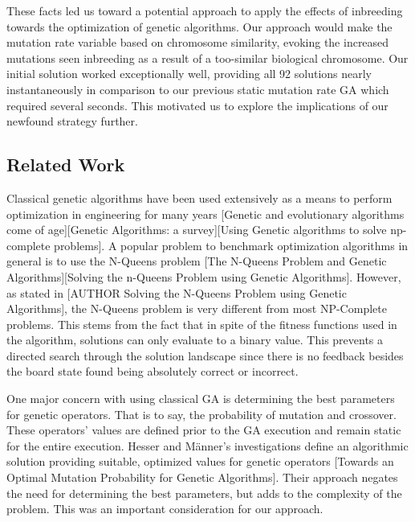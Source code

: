 \documentclass{sig-alternate}
\begin{document}
These facts led us toward a potential approach to apply the effects of inbreeding towards the optimization of genetic algorithms. Our approach would make the mutation rate variable based on chromosome similarity, evoking the increased mutations seen inbreeding as a result of a too-similar biological chromosome. Our initial solution worked exceptionally well, providing all 92 solutions nearly instantaneously in comparison to our previous static mutation rate GA which required several seconds. This motivated us to explore the implications of our newfound strategy further.

\subsection{Related Work}

Classical genetic algorithms have been used extensively as a means to perform optimization in engineering for many years [Genetic and evolutionary algorithms come of age][Genetic Algorithms: a survey][Using Genetic algorithms to solve np-complete problems]. A popular problem to benchmark optimization algorithms in general is to use the N-Queens problem [The N-Queens Problem and Genetic Algorithms][Solving the n-Queens Problem using Genetic Algorithms]. However, as stated in [AUTHOR Solving the N-Queens Problem using Genetic Algorithms], the N-Queens problem is very different from most NP-Complete problems. This stems from the fact that in spite of the fitness functions used in the algorithm, solutions can only evaluate to a binary value. This prevents a directed search through the solution landscape since there is no feedback besides the board state found being absolutely correct or incorrect. 

One major concern with using classical GA is determining the best parameters for genetic operators. That is to say, the probability of mutation and crossover. These operators' values are defined prior to the GA execution and remain static for the entire execution. Hesser and Männer's investigations define an algorithmic solution providing suitable, optimized values for genetic operators [Towards an Optimal Mutation Probability for Genetic Algorithms]. Their approach negates the need for determining the best parameters, but adds to the complexity of the problem. This was an important consideration for our approach.
\end{document}

